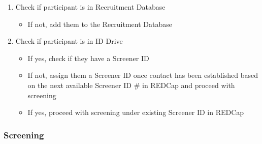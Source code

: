 \documentclass[]{book}
\providecommand{\tightlist}{%
  \setlength{\itemsep}{0pt}\setlength{\parskip}{0pt}}
\begin{document}
\begin{enumerate}
\def\labelenumi{\arabic{enumi}.}
\tightlist
\item
  Check if participant is in Recruitment Database

  \begin{itemize}
  \tightlist
  \item
    If not, add them to the Recruitment Database
  \end{itemize}
\item
  Check if participant is in ID Drive

  \begin{itemize}
  \tightlist
  \item
    If yes, check if they have a Screener ID
  \item
    If not, assign them a Screener ID once contact has been established based on the next available Screener ID \# in REDCap and proceed with screening
  \item
    If yes, proceed with screening under existing Screener ID in REDCap
  \end{itemize}
\end{enumerate}

\hypertarget{screening}{%
\subsubsection{Screening}\label{screening}}
\end{document}
